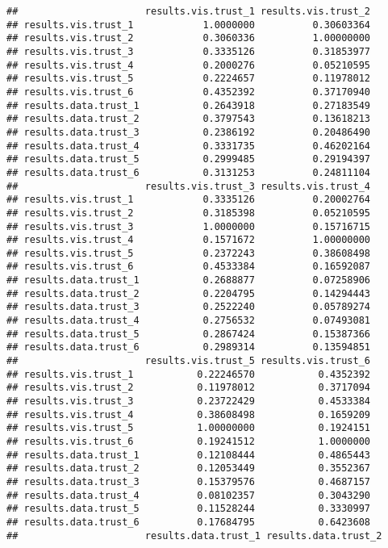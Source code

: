 \documentclass[
]{article}
\begin{document}
\begin{verbatim}
##                      results.vis.trust_1 results.vis.trust_2
## results.vis.trust_1            1.0000000          0.30603364
## results.vis.trust_2            0.3060336          1.00000000
## results.vis.trust_3            0.3335126          0.31853977
## results.vis.trust_4            0.2000276          0.05210595
## results.vis.trust_5            0.2224657          0.11978012
## results.vis.trust_6            0.4352392          0.37170940
## results.data.trust_1           0.2643918          0.27183549
## results.data.trust_2           0.3797543          0.13618213
## results.data.trust_3           0.2386192          0.20486490
## results.data.trust_4           0.3331735          0.46202164
## results.data.trust_5           0.2999485          0.29194397
## results.data.trust_6           0.3131253          0.24811104
##                      results.vis.trust_3 results.vis.trust_4
## results.vis.trust_1            0.3335126          0.20002764
## results.vis.trust_2            0.3185398          0.05210595
## results.vis.trust_3            1.0000000          0.15716715
## results.vis.trust_4            0.1571672          1.00000000
## results.vis.trust_5            0.2372243          0.38608498
## results.vis.trust_6            0.4533384          0.16592087
## results.data.trust_1           0.2688877          0.07258906
## results.data.trust_2           0.2204795          0.14294443
## results.data.trust_3           0.2522240          0.05789274
## results.data.trust_4           0.2756532          0.07493081
## results.data.trust_5           0.2867424          0.15387366
## results.data.trust_6           0.2989314          0.13594851
##                      results.vis.trust_5 results.vis.trust_6
## results.vis.trust_1           0.22246570           0.4352392
## results.vis.trust_2           0.11978012           0.3717094
## results.vis.trust_3           0.23722429           0.4533384
## results.vis.trust_4           0.38608498           0.1659209
## results.vis.trust_5           1.00000000           0.1924151
## results.vis.trust_6           0.19241512           1.0000000
## results.data.trust_1          0.12108444           0.4865443
## results.data.trust_2          0.12053449           0.3552367
## results.data.trust_3          0.15379576           0.4687157
## results.data.trust_4          0.08102357           0.3043290
## results.data.trust_5          0.11528244           0.3330997
## results.data.trust_6          0.17684795           0.6423608
##                      results.data.trust_1 results.data.trust_2

\end{verbatim}
\end{document}
